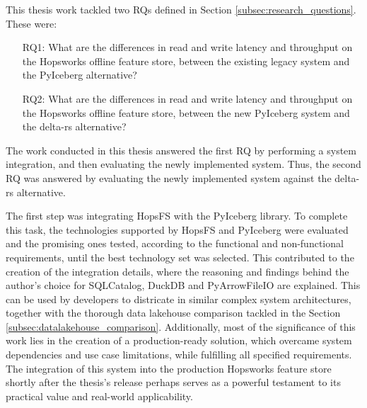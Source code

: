 This thesis work tackled two \glspl{RQ} defined in Section \ref{subsec:research_questions}. These were: 
\begin{enumerate}
    \item[RQ1:] What are the differences in read and write latency and throughput on the Hopsworks offline feature store, between the existing legacy system and the PyIceberg alternative?
    \item[RQ2:] What are the differences in read and write latency and throughput on the Hopsworks offline feature store, between the new PyIceberg system and the delta-rs alternative?
\end{enumerate}
The work conducted in this thesis answered the first \gls{RQ} by performing a system integration, and then evaluating the newly implemented system. Thus, the second \gls{RQ} was answered by evaluating the newly implemented system against the delta-rs alternative.

The first step was integrating \gls{HopsFS} with the PyIceberg library. To complete this task, the technologies supported by \gls{HopsFS} and PyIceberg were evaluated and the promising ones tested, according to the functional and non-functional requirements, until the best technology set was selected. This contributed to the creation of the integration details, where the reasoning and findings behind the author's choice for SQLCatalog, DuckDB and PyArrowFileIO are explained. This can be used by developers to districate in similar complex system architectures, together with the thorough data lakehouse comparison tackled in the Section \ref{subsec:datalakehouse_comparison}. Additionally, most of the significance of this work lies in the creation of a production-ready solution, which overcame system dependencies and use case limitations, while fulfilling all specified requirements. The integration of this system into the production Hopsworks feature store shortly after the thesis's release perhaps serves as a powerful testament to its practical value and real-world applicability.

